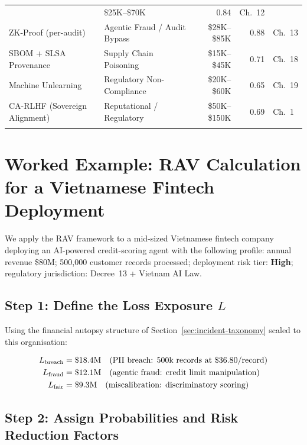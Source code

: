 \begin{table}[ht]
\begin{tabular}{p{3.0cm}p{2.6cm}rrp{1.8cm}}
  & \$25K--\$70K & 0.84
  & Ch.~12 \\[3pt]
ZK-Proof (per-audit)
  & Agentic Fraud / Audit Bypass
  & \$28K--\$85K & 0.88
  & Ch.~13 \\[3pt]
SBOM + SLSA Provenance
  & Supply Chain Poisoning
  & \$15K--\$45K & 0.71
  & Ch.~18 \\[3pt]
Machine Unlearning
  & Regulatory Non-Compliance
  & \$20K--\$60K & 0.65
  & Ch.~19 \\[3pt]
CA-RLHF (Sovereign Alignment)
  & Reputational / Regulatory
  & \$50K--\$150K & 0.69
  & Ch.~1 \\
\noalign{\smallskip}\hline\noalign{\smallskip}
\end{tabular}
\end{table}

\section{Worked Example: RAV Calculation for a Vietnamese
         Fintech Deployment}
\label{sec:rav-worked-example}

We apply the RAV framework to a mid-sized Vietnamese fintech
company deploying an AI-powered credit-scoring agent with the
following profile:
annual revenue \$80M;
500,000 customer records processed;
deployment risk tier: \textbf{High};
regulatory jurisdiction: Decree~13 + Vietnam AI Law.

\subsection{Step 1: Define the Loss Exposure $L$}
\label{subsec:step1-loss}

Using the financial autopsy structure of
Section~\ref{sec:incident-taxonomy} scaled to this organisation:

\begin{align}
  L_{\mathrm{breach}} &= \$18.4\text{M}
    \quad \text{(PII breach: 500k records at \$36.80/record)} \notag\\
  L_{\mathrm{fraud}}  &= \$12.1\text{M}
    \quad \text{(agentic fraud: credit limit manipulation)} \notag\\
  L_{\mathrm{fair}}   &= \$ 9.3\text{M}
    \quad \text{(miscalibration: discriminatory scoring)} \notag
\end{align}

\subsection{Step 2: Assign Probabilities and Risk Reduction
            Factors}
\label{subsec:step2-prob}

